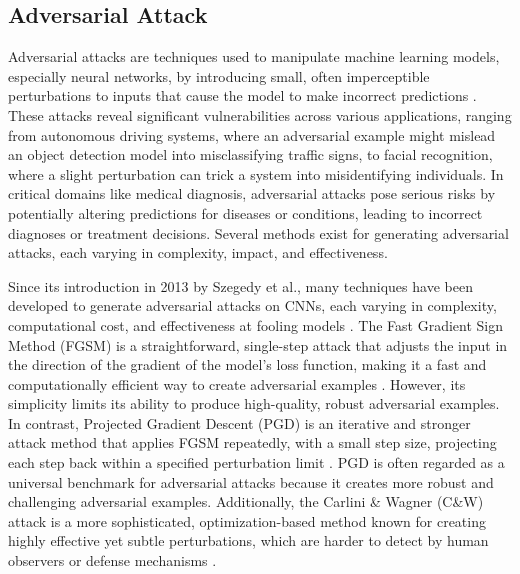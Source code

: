 \documentclass[journal,onecolumn,12pt]{IEEEtran}
\begin{document}
\subsection{Adversarial Attack}
Adversarial attacks are techniques used to manipulate machine learning models, especially neural networks, by introducing small, often imperceptible perturbations to inputs that cause the model to make incorrect predictions \cite{Li_2022}. These attacks reveal significant vulnerabilities across various applications, ranging from autonomous driving systems, where an adversarial example might mislead an object detection model into misclassifying traffic signs, to facial recognition, where a slight perturbation can trick a system into misidentifying individuals. In critical domains like medical diagnosis, adversarial attacks pose serious risks by potentially altering predictions for diseases or conditions, leading to incorrect diagnoses or treatment decisions. Several methods exist for generating adversarial attacks, each varying in complexity, impact, and effectiveness. 

Since its introduction in 2013 by Szegedy et al., many techniques have been developed to generate adversarial attacks on CNNs, each varying in complexity, computational cost, and effectiveness at fooling models \cite{szegedy2014intriguingpropertiesneuralnetworks}. The Fast Gradient Sign Method (FGSM) is a straightforward, single-step attack that adjusts the input in the direction of the gradient of the model's loss function, making it a fast and computationally efficient way to create adversarial examples \cite{goodfellow2015explainingharnessingadversarialexamples}. However, its simplicity limits its ability to produce high-quality, robust adversarial examples. In contrast, Projected Gradient Descent (PGD) is an iterative and stronger attack method that applies FGSM repeatedly, with a small step size, projecting each step back within a specified perturbation limit \cite{madry2019deeplearningmodelsresistant}. PGD is often regarded as a universal benchmark for adversarial attacks because it creates more robust and challenging adversarial examples. Additionally, the Carlini \& Wagner (C\&W) attack is a more sophisticated, optimization-based method known for creating highly effective yet subtle perturbations, which are harder to detect by human observers or defense mechanisms \cite{carlini2017evaluatingrobustnessneuralnetworks}.
\end{document}
